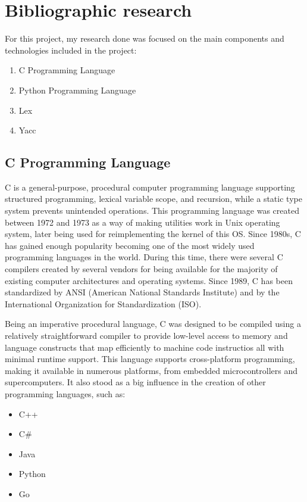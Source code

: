\documentclass[12pt,a4paper,twoside]{report}
\begin{document}
\chapter{Bibliographic research}

For this project, my research done was focused on the main components and technologies included in the project:
\begin{enumerate}\bfseries
	\item C Programming Language
	\item Python Programming Language
	\item Lex
	\item Yacc
\end{enumerate}
 
\section{C Programming Language}
 C is a general-purpose, procedural computer programming language supporting structured programming, lexical variable scope, and recursion, while a static type system prevents unintended operations. This programming language was created between 1972 and 1973 as a way of making utilities work in Unix operating system, later being used for reimplementing the kernel of this OS. Since 1980s, C has gained enough popularity becoming one of the most widely used programming languages in the world. During this time, there were several C compilers created by several vendors for being available for the majority of existing computer architectures and operating systems. Since 1989, C has been standardized by ANSI (American National Standards Institute) and by the International Organization for Standardization (ISO). 
  
 Being an imperative procedural language, C was designed to be compiled using a relatively straightforward compiler to provide low-level access to memory and language constructs that map efficiently to machine code instructios all with minimal runtime support. This language supports cross-platform programming, making it available in numerous platforms, from embedded microcontrollers and supercomputers. It also stood as a big influence in the creation of other programming languages, such as:
 \begin{itemize}
 	\item C++
 	\item C\#
 	\item Java
 	\item Python
 	\item Go
 \end{itemize}
\end{document}
